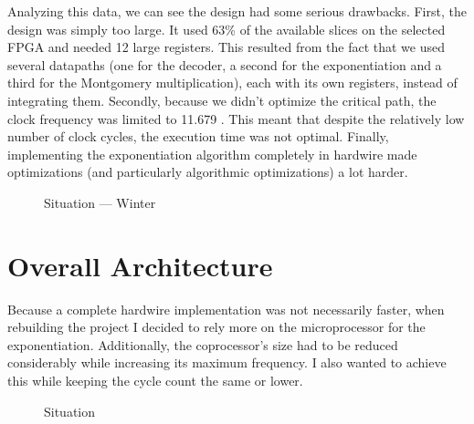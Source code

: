 \documentclass[a4paper]{article}
\begin{document}
Analyzing this data, we can see the design had some serious drawbacks. First, the design was simply too large. It used 63\% of the available slices on the selected FPGA and needed 12 large registers. This resulted from the fact that we used several datapaths (one for the decoder, a second for the exponentiation and a third for the Montgomery multiplication), each with its own registers, instead of integrating them. Secondly, because we didn't optimize the critical path, the clock frequency was limited to 11.679 \mega\hertz. This meant that despite the relatively low number of clock cycles, the execution time was not optimal. Finally, implementing the exponentiation algorithm completely in hardwire made optimizations (and particularly algorithmic optimizations) a lot harder.

\begin{figure}[H]
	\caption{Situation --- Winter}
	\label{fig:situation_winter}
\end{figure}

\section{Overall Architecture}

Because a complete hardwire implementation was not necessarily faster, when rebuilding the project I decided to rely more on the microprocessor for the exponentiation. Additionally, the coprocessor's size had to be reduced considerably while increasing its maximum frequency. I also wanted to achieve this while keeping the cycle count the same or lower.\\

\begin{figure}[H]
	\caption{Situation}
	\label{fig:situation_winter}
\end{figure}
\end{document}
